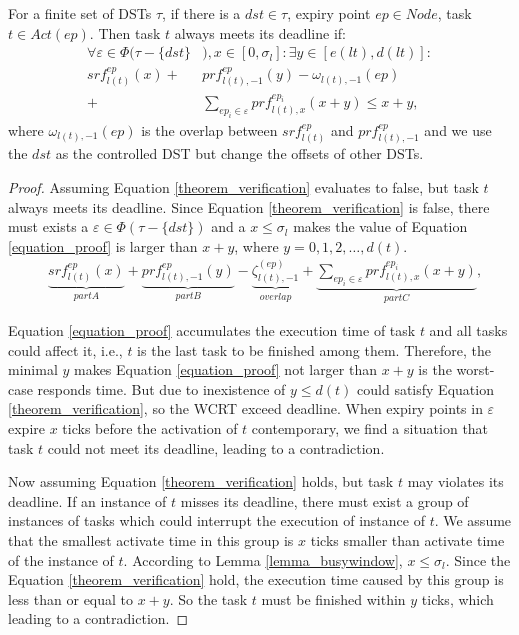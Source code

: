 \documentclass[sigconf]{acmart}
\begin{document}
\begin{theorem}
  For a finite set of DSTs $\tau$, if there is a $dst\in\tau$, expiry point $ep\in Node$, task $t\in Act(ep)$. Then task $t$ always meets its deadline if:
   \begin{equation}\begin{split}
      \forall \varepsilon\in\Phi(\tau-\{dst\}&),x\in[0,\sigma_l]:\exists y\in[e(lt),d(lt)]:\\
      srf^{ep}_{l(t)}(x)+&prf^{ep}_{l(t),-1}(y)-\omega_{l(t),-1}(ep)\\
      +&\sum\limits_{ep_i\in \varepsilon}prf^{ep_i}_{l(t),x}(x+y)\leq x+y,
    \end{split}\label{theorem_verification}\end{equation}
    where $\omega_{l(t),-1}(ep)$ is the overlap between $srf^{ep}_{l(t)}$ and $prf^{ep}_{l(t),-1}$ and we use the $dst$ as the controlled DST but change the offsets of other DSTs.
\end{theorem}
\begin{proof}

  Assuming Equation \ref{theorem_verification} evaluates to false, but task $t$ always meets its deadline. Since Equation \ref{theorem_verification} is false, there must exists a $\varepsilon\in\Phi(\tau-\{dst\})$ and a $x\leq \sigma_l$ makes the value of Equation \ref{equation_proof} is larger than $x+y$, where $y=0,1,2,\dots,d(t)$.
  \begin{equation}\begin{split}
      &\underbrace{srf^{ep}_{l(t)}(x)}_{part A}+\underbrace{prf^{ep}_{l(t),-1}(y)}_{part B}-\underbrace{\zeta^{(ep)}_{l(t),-1}}_{overlap}+\underbrace{\sum\limits_{ep_i\in \varepsilon}prf^{ep_i}_{l(t),x}(x+y)}_{part C},
    \end{split}\label{equation_proof}\end{equation}
  
  Equation \ref{equation_proof} accumulates the execution time of task $t$ and all tasks could affect it, i.e., $t$ is the last task to be finished among them. Therefore, the minimal $y$ makes Equation \ref{equation_proof} not larger than $x+y$ is the worst-case responds time. But due to inexistence of $y\leq d(t)$ could satisfy Equation \ref{theorem_verification}, so the WCRT exceed deadline. When expiry points in $\varepsilon$ expire $x$ ticks before the activation of $t$ contemporary, we find a situation that task $t$ could not meet its deadline, leading to a contradiction. 
  
  Now assuming Equation \ref{theorem_verification} holds, but task $t$ may violates its deadline. If an instance of $t$ misses its deadline, there must exist a group of instances of tasks which could interrupt the execution of instance of $t$. We assume that the smallest activate time in this group is $x$ ticks smaller than activate time of the instance of $t$. According to Lemma \ref{lemma_busywindow}, $x\leq \sigma_l$. Since the Equation \ref{theorem_verification} hold, the execution time caused by this group is less than or equal to $x+y$. So the task $t$ must be finished within $y$ ticks, which leading to a contradiction.
\end{proof}
\end{document}
